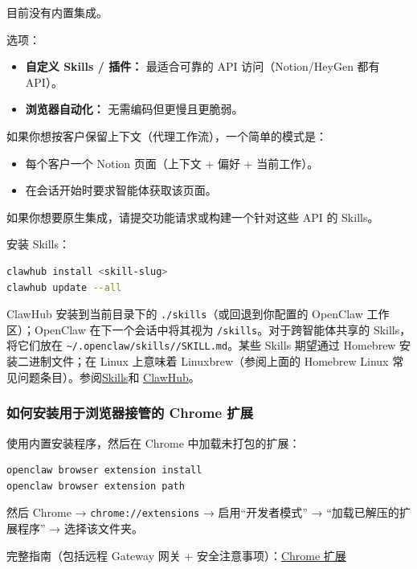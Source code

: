 目前没有内置集成。

选项：

\begin{itemize}
  \item \textbf{自定义 Skills / 插件：} 最适合可靠的 API 访问（Notion/HeyGen 都有 API）。
  \item \textbf{浏览器自动化：} 无需编码但更慢且更脆弱。
\end{itemize}


如果你想按客户保留上下文（代理工作流），一个简单的模式是：

\begin{itemize}
  \item 每个客户一个 Notion 页面（上下文 + 偏好 + 当前工作）。
  \item 在会话开始时要求智能体获取该页面。
\end{itemize}


如果你想要原生集成，请提交功能请求或构建一个针对这些 API 的 Skills。

安装 Skills：

\begin{lstlisting}[language=bash]
clawhub install <skill-slug>
clawhub update --all
\end{lstlisting}


ClawHub 安装到当前目录下的 \texttt{./skills}（或回退到你配置的 OpenClaw 工作区）；OpenClaw 在下一个会话中将其视为 \texttt{/skills}。对于跨智能体共享的 Skills，将它们放在 \texttt{\textasciitilde{}/.openclaw/skills//SKILL.md}。某些 Skills 期望通过 Homebrew 安装二进制文件；在 Linux 上意味着 Linuxbrew（参阅上面的 Homebrew Linux 常见问题条目）。参阅\href{/tools/skills}{Skills}和 \href{/tools/clawhub}{ClawHub}。

\subsubsection{如何安装用于浏览器接管的 Chrome 扩展}


使用内置安装程序，然后在 Chrome 中加载未打包的扩展：

\begin{lstlisting}[language=bash]
openclaw browser extension install
openclaw browser extension path
\end{lstlisting}


然后 Chrome → \texttt{chrome://extensions} → 启用“开发者模式” → “加载已解压的扩展程序” → 选择该文件夹。

完整指南（包括远程 Gateway 网关 + 安全注意事项）：\href{/tools/chrome-extension}{Chrome 扩展}

